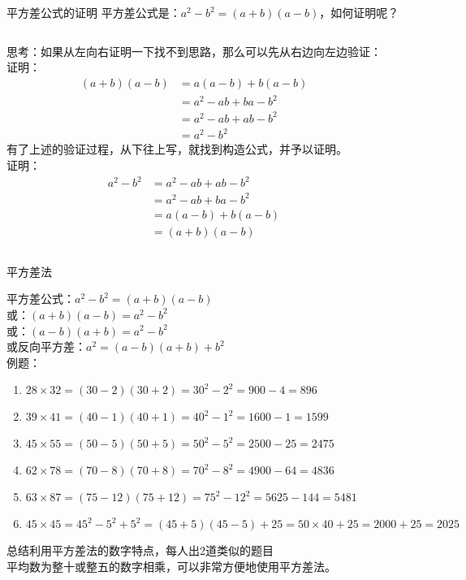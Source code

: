 \documentclass[aspectratio=169]{ctexbeamer} %
\date{\today}
\begin{document}
\begin{frame}[t]{平方差公式的证明}
平方差公式是：$a^2 - b^2 = (a + b)(a - b)$，如何证明呢？
\vspace{1cm}
\begin{columns}[t]
思考：如果从左向右证明一下找不到思路，那么可以先从右边向左边验证：\\
证明：
\begin{align*}
  (a + b)(a - b) &= a(a - b) + b(a - b)  \\
  &= a^2 - ab + ba - b^2 \\
  &= a^2 - ab + ab - b^2 \\
  &= a^2 - b^2
\end{align*}
 有了上述的验证过程，从下往上写，就找到构造公式，并予以证明。\\
 证明：
\begin{align*}
  a^2 - b^2  &= a^2 - ab + ab - b^2 \\
  &= a^2 - ab + ba - b^2 \\
  &= a(a - b) + b(a - b) \\
  &= (a + b)(a - b) 
 \end{align*}
\end{columns}
\end{frame}


\begin{frame}[t]{平方差法}
\begin{spacing}{1.2}
\normalsize
平方差公式：$a^2 - b^2 = (a+b)(a-b)$ \\
或：$(a+b)(a-b)=a^2 - b^2$ \\
或：$(a-b)(a+b)=a^2 - b^2$ \\
或反向平方差：$a^2 = (a-b)(a+b) + b^2$ \\
例题：
\begin{enumerate}[label={\arabic*.}]
\item $28 \times 32  = (30-2)(30+2)=30^2-2^2=900-4=896$
\item $39 \times 41  = (40-1)(40+1)=40^2-1^2=1600-1=1599$
\item $45 \times 55  = (50-5)(50+5)=50^2-5^2=2500-25=2475$
\item $62 \times 78  = (70-8)(70+8)=70^2-8^2=4900-64=4836$
\item $63 \times 87  = (75-12)(75+12)=75^2-12^2=5625-144=5481$
\item $45 \times 45  = 45^2 - 5^2 + 5^2 = (45+5)(45-5) + 25 =50 \times 40 + 25=2000 + 25 = 2025$
\end{enumerate}
\alert{总结利用平方差法的数字特点，每人出2道类似的题目} \\

平均数为整十或整五的数字相乘，可以非常方便地使用平方差法。
\end{spacing}
\end{frame}
\end{document}
